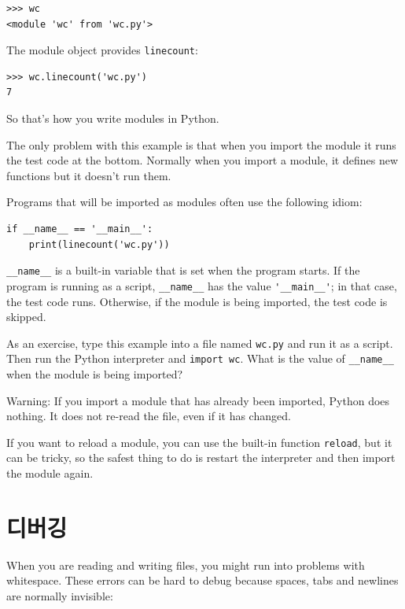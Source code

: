 \documentclass[10pt]{book}
\begin{document}
\begin{verbatim}
>>> wc
<module 'wc' from 'wc.py'>
\end{verbatim}
%
The module object provides \verb"linecount":

\begin{verbatim}
>>> wc.linecount('wc.py')
7
\end{verbatim}
%
So that's how you write modules in Python.

The only problem with this example is that when you import
the module it runs the test code at the bottom.  Normally
when you import a module, it defines new functions but it
doesn't run them.

Programs that will be imported as modules often
use the following idiom:

\begin{verbatim}
if __name__ == '__main__':
    print(linecount('wc.py'))
\end{verbatim}
%
\verb"__name__" is a built-in variable that is set when the
program starts.  If the program is running as a script,
\verb"__name__" has the value \verb"'__main__'"; in that
case, the test code runs.  Otherwise,
if the module is being imported, the test code is skipped.


As an exercise, type this example into a file named {\tt wc.py} and run
it as a script.  Then run the Python interpreter and
{\tt import wc}.  What is the value of \verb"__name__"
when the module is being imported?

Warning: If you import a module that has already been imported,
Python does nothing.  It does not re-read the file, even if it has
changed.

If you want to reload a module, you can use the built-in function 
{\tt reload}, but it can be tricky, so the safest thing to do is
restart the interpreter and then import the module again.


\section{디버깅}

When you are reading and writing files, you might run into problems
with whitespace.  These errors can be hard to debug because spaces,
tabs and newlines are normally invisible:
\end{document}
